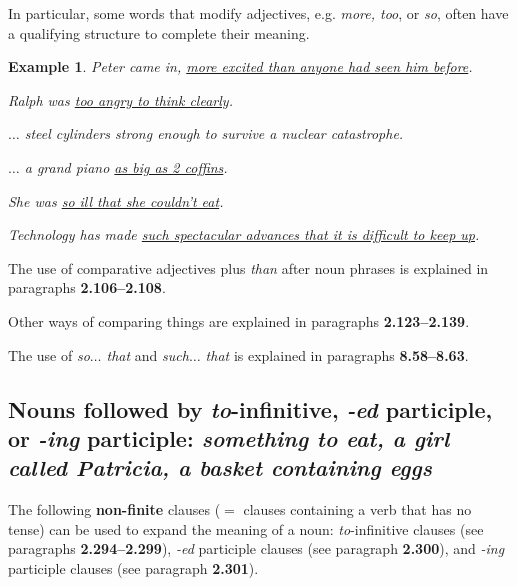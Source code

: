 \documentclass[oneside]{book}
\numberwithin{equation}{section}
\newtheorem{example}{Example}[section]
\begin{document}
In particular, some words that modify adjectives, e.g. \textit{more, too}, or \textit{so}, often have a qualifying structure to complete their meaning.
\begin{example}
    Peter came in, \underline{more excited than anyone had seen him before}.
    
    Ralph was \underline{too angry to think clearly}.
    
    $\ldots$ steel cylinders strong enough to survive a nuclear catastrophe.
    
    $\ldots$ a grand piano \underline{as big as 2 coffins}.
    
    She was \underline{so ill that she couldn't eat}.
    
    Technology has made \underline{such spectacular advances that it is difficult to keep up}.
\end{example}
The use of comparative adjectives plus \textit{than} after noun phrases is explained in paragraphs \textbf{2.106--2.108}.

Other ways of comparing things are explained in paragraphs \textbf{2.123--2.139}.

The use of \textit{so$\ldots$ that} and \textit{such$\ldots$ that} is explained in paragraphs \textbf{8.58--8.63}.

\subsection{Nouns followed by \textit{to}-infinitive, \textit{-ed} participle, or \textit{-ing} participle: \textit{something to eat, a girl called Patricia, a basket containing eggs}}
\noindent{} The following \textbf{non-finite} clauses ($=$ clauses containing a verb that has no tense) can be used to expand the meaning of a noun: \textit{to}-infinitive clauses (see paragraphs \textbf{2.294--2.299}), \textit{-ed} participle clauses (see paragraph \textbf{2.300}), and \textit{-ing} participle clauses (see paragraph \textbf{2.301}).
\end{document}
